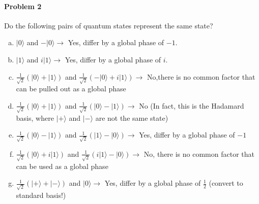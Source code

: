\documentclass[12pt]{article}
\theoremstyle{mytheor}
\begin{document}
\paragraph{Problem 2} Do the following pairs of quantum states represent the same state?
\begin{enumerate}[a)] %
\item $|0\rangle$ and $-|0\rangle \rightarrow$ Yes, differ by a global phase of $-1$.
\item $|1\rangle$ and $i|1\rangle \rightarrow$ Yes, differ by a global phase of $i$.
\item $\frac{1}{\sqrt{2}}(|0\rangle + |1\rangle)$ and $\frac{1}{\sqrt{2}}(-|0\rangle + i|1\rangle) \rightarrow$ No,there is no common factor that can be pulled out as a global phase
\item $\frac{1}{\sqrt{2}}(|0\rangle + |1\rangle)$ and $\frac{1}{\sqrt{2}}(|0\rangle - |1\rangle) \rightarrow$ No (In fact, this is the Hadamard basis, where $|+\rangle$ and $|-\rangle$ are not the same state)
\item $\frac{1}{\sqrt{2}}(|0\rangle - |1\rangle)$ and $\frac{1}{\sqrt{2}}(|1\rangle - |0\rangle) \rightarrow$ Yes, differ by a global phase of $-1$
\item $\frac{1}{\sqrt{2}}(|0\rangle + i|1\rangle)$ and $\frac{1}{\sqrt{2}}(i|1\rangle - |0\rangle) \rightarrow$ No, there is no common factor that can be used as a global phase
\item $\frac{1}{\sqrt{2}}(|+\rangle + |-\rangle)$ and $|0\rangle \rightarrow$ Yes, differ by a global phase of $\frac{1}{2}$ (convert to standard basis!)
\end{enumerate}
\end{document}
